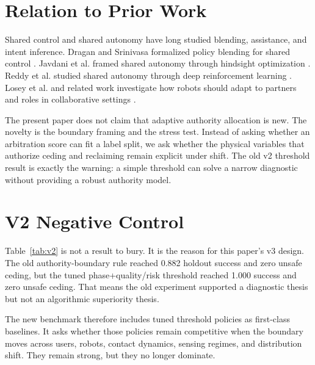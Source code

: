 \documentclass{article}
\begin{document}
\section{Relation to Prior Work}

Shared control and shared autonomy have long studied blending, assistance, and intent inference. Dragan and Srinivasa formalized policy blending for shared control \citep{dragan2013}. Javdani et al. framed shared autonomy through hindsight optimization \citep{javdani2015}. Reddy et al. studied shared autonomy through deep reinforcement learning \citep{reddy2018}. Losey et al. and related work investigate how robots should adapt to partners and roles in collaborative settings \citep{losey2018}.

The present paper does not claim that adaptive authority allocation is new. The novelty is the boundary framing and the stress test. Instead of asking whether an arbitration score can fit a label split, we ask whether the physical variables that authorize ceding and reclaiming remain explicit under shift. The old v2 threshold result is exactly the warning: a simple threshold can solve a narrow diagnostic without providing a robust authority model.

\section{V2 Negative Control}

\begin{table}[t]
\centering
\small

\caption{V2 tuned-threshold negative control. Thresholds selected on 396 training cases were evaluated on a 204-case holdout split. The tuned phase+quality/risk threshold recovered the old labels perfectly, proving that the old diagnostic was too close to its generating rule.}
\label{tab:v2}
\end{table}

Table~\ref{tab:v2} is not a result to bury. It is the reason for this paper's v3 design. The old authority-boundary rule reached 0.882 holdout success and zero unsafe ceding, but the tuned phase+quality/risk threshold reached 1.000 success and zero unsafe ceding. That means the old experiment supported a diagnostic thesis but not an algorithmic superiority thesis.

The new benchmark therefore includes tuned threshold policies as first-class baselines. It asks whether those policies remain competitive when the boundary moves across users, robots, contact dynamics, sensing regimes, and distribution shift. They remain strong, but they no longer dominate.
\end{document}

